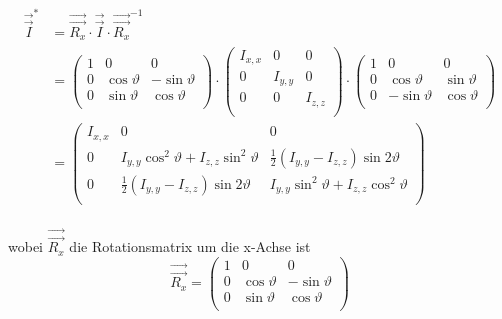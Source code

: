 \begin{align}
    \vec{\vec{I}}^* &= \vec{\vec{R_x}} \cdot \vec{\vec{I}} \cdot \vec{\vec{R_x}}^{-1} \\
                    &=  \begin{pmatrix}
                            1 & 0               & 0                \\
                            0 & \cos{\vartheta} & -\sin{\vartheta} \\
                            0 & \sin{\vartheta} & \cos{\vartheta}  \\
                        \end{pmatrix} \cdot
                        \begin{pmatrix}
                            I_{x,x} & 0       & 0       \\
                            0       & I_{y,y} & 0       \\
                            0       & 0       & I_{z,z} \\
                        \end{pmatrix} \cdot
                        \begin{pmatrix}
                            1 & 0                & 0               \\
                            0 & \cos{\vartheta}  & \sin{\vartheta} \\
                            0 & -\sin{\vartheta} & \cos{\vartheta} \\
                        \end{pmatrix} \\
                    &=  \begin{pmatrix}
                            I_{x,x} & 0                                                         & 0                                                         \\
                            0       & I_{y,y}\cos^2{\vartheta} + I_{z,z}\sin^2{\vartheta}       & \frac{1}{2}\left(I_{y,y} - I_{z,z}\right)\sin{2\vartheta} \\
                            0       & \frac{1}{2}\left(I_{y,y} - I_{z,z}\right)\sin{2\vartheta} & I_{y,y}\sin^2{\vartheta} + I_{z,z}\cos^2{\vartheta}       \\
                        \end{pmatrix} \\
\end{align}

wobei $\vec{\vec{R_x}}$ die Rotationsmatrix um die x-Achse ist
\begin{equation}
    \vec{\vec{R_x}} =
    \begin{pmatrix}
        1 & 0               & 0                \\
        0 & \cos{\vartheta} & -\sin{\vartheta} \\
        0 & \sin{\vartheta} & \cos{\vartheta}  \\
    \end{pmatrix}
\end{equation}


